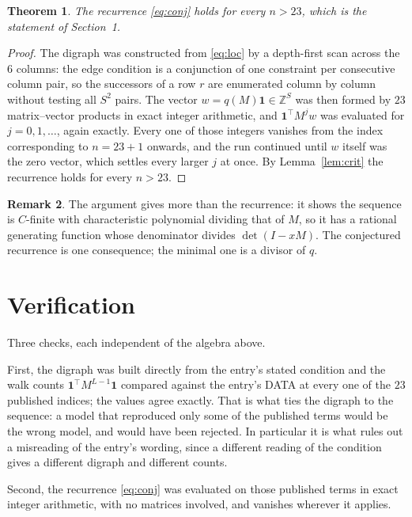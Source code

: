 \documentclass[11pt,a4paper]{article}
\theoremstyle{plain}
\newtheorem{theorem}{Theorem}
\theoremstyle{definition}
\newtheorem{remark}[theorem]{Remark}
\begin{document}
\begin{theorem}
The recurrence \eqref{eq:conj} holds for every $n>23$, which is the statement of
Section~1.
\end{theorem}

\begin{proof}
The digraph was constructed from \eqref{eq:loc} by a depth-first scan across the $6$
columns: the edge condition is a conjunction of one constraint per consecutive column
pair, so the successors of a row $r$ are enumerated column by column without testing all
$S^2$ pairs. The vector $w=q(M)\mathbf{1}\in\mathbb{Z}^{S}$ was then formed by $23$
matrix--vector products in exact integer arithmetic, and $\mathbf{1}^{\!\top}M^{j}w$ was
evaluated for $j=0,1,\dots$, again exactly. Every one of those integers vanishes from the
index corresponding to $n=23+1$ onwards, and the run continued until $w$ itself was the
zero vector, which settles every larger $j$ at once. By Lemma~\ref{lem:crit} the recurrence
holds for every $n>23$.
\end{proof}

\begin{remark}
The argument gives more than the recurrence: it shows the sequence is $C$-finite with
characteristic polynomial dividing that of $M$, so it has a rational generating function
whose denominator divides $\det(I-xM)$. The conjectured recurrence is one consequence; the
minimal one is a divisor of $q$.
\end{remark}

\section{Verification}

Three checks, each independent of the algebra above.

First, the digraph was built directly from the entry's stated condition and the walk counts
$\mathbf{1}^{\!\top}M^{L-1}\mathbf{1}$ compared against the entry's DATA at
every one of the $23$ published indices; the values agree exactly. That is what ties
the digraph to the sequence: a model that reproduced only some of the published terms would
be the wrong model, and would have been rejected. In particular it is what rules out a
misreading of the entry's wording, since a different reading of the condition gives a
different digraph and different counts.

Second, the recurrence \eqref{eq:conj} was evaluated on those published terms in exact
integer arithmetic, with no matrices involved, and vanishes wherever it applies.
\end{document}
